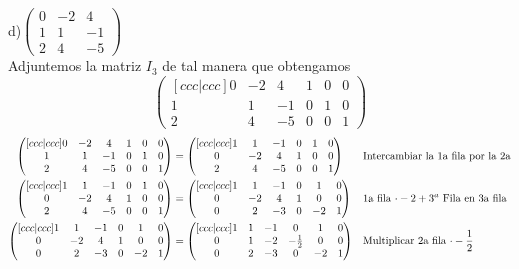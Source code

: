 \documentclass[letterpaper]{article}
\renewcommand{\*}{\cdot}
\theoremstyle{definition}
\begin{document}
	d)$\begin{pmatrix} 0 & -2 & 4 \\ 1 & 1 & -1 \\ 2 & 4 & -5 \end{pmatrix}$\\
	Adjuntemos la matriz $ I_3 $ de tal manera que obtengamos
	\[\begin{pmatrix}[ccc|ccc]
	0 & -2 & 4 & 1 & 0 & 0\\
	1 & 1 & -1 & 0 & 1 & 0\\
	2 & 4 & -5 & 0 & 0 & 1
	\end{pmatrix}\]
	\begin{align*}
		\begin{pmatrix}[ccc|ccc]
		0 & -2 & 4 & 1 & 0 & 0\\
		1 & 1 & -1 & 0 & 1 & 0\\
		2 & 4 & -5 & 0 & 0 & 1
		\end{pmatrix} & = \begin{pmatrix}[ccc|ccc]
		1 & 1 & -1 & 0 & 1 & 0\\
		0 & -2 & 4 & 1 & 0 & 0\\
		2 & 4 & -5 & 0 & 0 & 1
		\end{pmatrix} && \text{Intercambiar la 1a fila por la 2a}\\
		\begin{pmatrix}[ccc|ccc]
		1 & 1 & -1 & 0 & 1 & 0\\
		0 & -2 & 4 & 1 & 0 & 0\\
		2 & 4 & -5 & 0 & 0 & 1
		\end{pmatrix} & = \begin{pmatrix}[ccc|ccc]
		1 & 1 & -1 & 0 & 1 & 0\\
		0 & -2 & 4 & 1 & 0 & 0\\
		0 & 2 & -3 & 0 & -2 & 1
		\end{pmatrix} && \text{1a fila $ \* -2  + 3^a$ Fila en 3a fila}\\
		\begin{pmatrix}[ccc|ccc]
		1 & 1 & -1 & 0 & 1 & 0\\
		0 & -2 & 4 & 1 & 0 & 0\\
		0 & 2 & -3 & 0 & -2 & 1
		\end{pmatrix} &= \begin{pmatrix}[ccc|ccc]
		1 & 1 & -1 & 0 & 1 & 0\\
		0 & 1 & -2 & -\frac{1}{2} & 0 & 0\\
		0 & 2 & -3 & 0 & -2 & 1
		\end{pmatrix} && \text{Multiplicar 2a fila $ \* -\dfrac{1}{2} $}\\

\end{align*}
\end{document}
